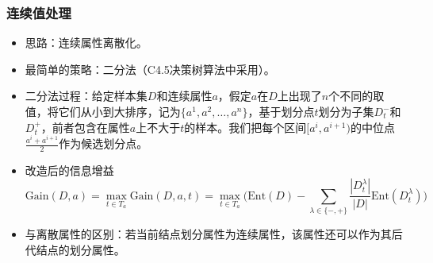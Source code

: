 \documentclass{ctexart}
\begin{document}
					\subsubsection{连续值处理}
						\begin{itemize}
							\item 思路：连续属性离散化。
							\item 最简单的策略：二分法（C4.5决策树算法中采用）。
							\item 二分法过程：给定样本集$D$和连续属性$a$，假定$a$在$D$上出现了$n$个不同的取值，将它们从小到大排序，记为$\{a^1,a^2,\dots,a^n\}$，基于划分点$t$划分为子集$D_t^-$和$D_t^+$，前者包含在属性$a$上不大于$t$的样本。我们把每个区间$[a^i,a^{i+1})$的中位点$\frac{a^i+a^{i+1}}{2}$作为候选划分点。
							\item 改造后的信息增益\[\mathrm{Gain}(D,a)=\max\limits_{t\in T_a}\mathrm{Gain}(D,a,t)=\max\limits_{t\in T_a}\big(\mathrm{Ent}(D)-\sum_{\lambda\in\{-,+\}}^{}\frac{|D_t^\lambda|}{|D|}\mathrm{Ent}(D_t^\lambda)\big)\]
							\item 与离散属性的区别：若当前结点划分属性为连续属性，该属性还可以作为其后代结点的划分属性。
						\end{itemize}
\end{document}
